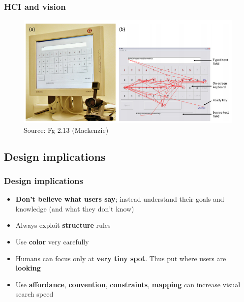 \documentclass{beamer}
\begin{document}
\begin{frame}
	\frametitle{HCI and vision}
	\begin{figure}
		\includegraphics[width=1\linewidth]{image/2-13}
		\caption{Source: Fg 2.13 (Mackenzie)}
	\end{figure}
\end{frame}

\subsection{Design implications}

\begin{frame}
\frametitle{Design implications}
	\begin{itemize}
		\item\textbf{Don't believe what users say}; instead understand their goals and knowledge (and what they don't know)
		\item Always exploit \textbf{structure} rules
		\item Use \textbf{color} very carefully
		\item Humans can focus only at \textbf{very tiny spot}.  Thus put where users are \textbf{looking}
		\item Use \textbf{affordance}, \textbf{convention}, \textbf{constraints}, \textbf{mapping} can increase visual search speed
	\end{itemize}
\end{frame}


%
\end{document}
